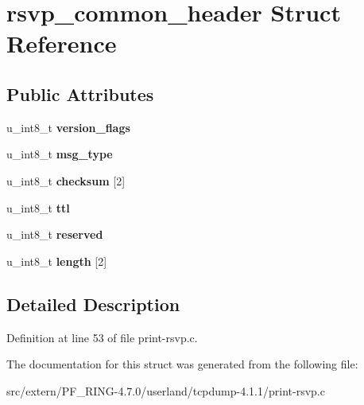 \hypertarget{structrsvp__common__header}{
\section{rsvp\_\-common\_\-header Struct Reference}
\label{structrsvp__common__header}
}
\subsection*{Public Attributes}
\begin{DoxyCompactItemize}
\item 
\hypertarget{structrsvp__common__header_a0c1a530a0e2bf0343b36eb01e702338a}{
u\_\-int8\_\-t {\bfseries version\_\-flags}}
\label{structrsvp__common__header_a0c1a530a0e2bf0343b36eb01e702338a}

\item 
\hypertarget{structrsvp__common__header_a06f935dbda7a68bab129e15a9c5e2823}{
u\_\-int8\_\-t {\bfseries msg\_\-type}}
\label{structrsvp__common__header_a06f935dbda7a68bab129e15a9c5e2823}

\item 
\hypertarget{structrsvp__common__header_a814880a3189d0f7f2177226de9cafe63}{
u\_\-int8\_\-t {\bfseries checksum} \mbox{[}2\mbox{]}}
\label{structrsvp__common__header_a814880a3189d0f7f2177226de9cafe63}

\item 
\hypertarget{structrsvp__common__header_aed0f200a5063c905b8d60ecbf1715f79}{
u\_\-int8\_\-t {\bfseries ttl}}
\label{structrsvp__common__header_aed0f200a5063c905b8d60ecbf1715f79}

\item 
\hypertarget{structrsvp__common__header_aad2832b4b0f1a8254eb0c249c1c3088f}{
u\_\-int8\_\-t {\bfseries reserved}}
\label{structrsvp__common__header_aad2832b4b0f1a8254eb0c249c1c3088f}

\item 
\hypertarget{structrsvp__common__header_ae185ec7d29e9e67ea54a2beedcdbbfda}{
u\_\-int8\_\-t {\bfseries length} \mbox{[}2\mbox{]}}
\label{structrsvp__common__header_ae185ec7d29e9e67ea54a2beedcdbbfda}

\end{DoxyCompactItemize}


\subsection{Detailed Description}


Definition at line 53 of file print-\/rsvp.c.



The documentation for this struct was generated from the following file:\begin{DoxyCompactItemize}
\item 
src/extern/PF\_\-RING-\/4.7.0/userland/tcpdump-\/4.1.1/print-\/rsvp.c\end{DoxyCompactItemize}
